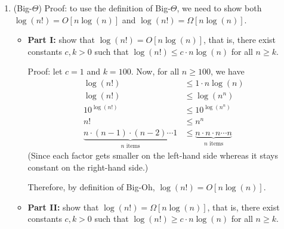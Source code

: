 \documentclass{article}
\begin{document}
\begin{enumerate}

  \item (Big-$\Theta$) Proof: to use the definition of Big-$\Theta$, we need to show both $\log(n!) = O[n\log(n)]$ and $\log(n!) = \Omega[n\log(n)]$.

    \begin{itemize}
      \item \textbf{Part I:} show that $\log(n!) = O[n\log(n)]$, that is, there exist constants $c, k > 0$ such that $\log(n!) \le c \cdot n\log(n)$ for all $n \ge k$.

        Proof: let $c = 1$ and $k = 100$. Now, for all $n \ge 100$, we have
        $$
          \begin{aligned}
            \log(n!)      & \le 1 \cdot n\log(n)                                        \\
            \log(n!)      & \le \log(n^n)                                               \\
            10^{\log(n!)} & \le 10^{\log(n^n)}                                          \\
            n!            & \le n^n                                                     \\
            \underbrace{n \cdot (n-1) \cdot (n-2) \cdots 1}_{n\text{ items}}
                          & \le \underbrace{n \cdot n \cdot n\cdots n}_{n\text{ items}}
          \end{aligned}
        $$
        (Since each factor gets smaller on the left-hand side whereas it stays constant on the right-hand side.)

        Therefore, by definition of Big-Oh, $\log(n!) = O[n\log(n)]$.

      \item \textbf{Part II:} show that $\log(n!) = \Omega[n\log(n)]$, that is, there exist constants $c, k > 0$ such that $\log(n!) \ge c \cdot n\log(n)$ for all $n \ge k$.


\end{itemize}
\end{enumerate}
\end{document}
